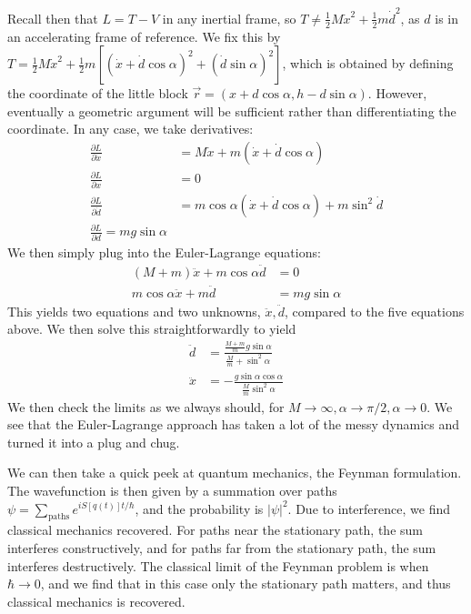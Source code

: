 \documentclass[10pt]{report}
\newcommand{\pd}[2]{\frac{\partial #1}{\partial#2}}
\newcommand{\abs}[1]{\left|#1\right|}
\begin{document}
Recall then that $L=T-V$ in any inertial frame, so $T \neq \frac{1}{2}M\dot{x}^2 + \frac{1}{2}m\dot{d}^2$, as $d$ is in an accelerating frame of reference. We fix this by $T=\frac{1}{2}M\dot{x}^2 + \frac{1}{2}m\left[ \left( \dot{x} + \dot{d}\cos\alpha \right)^2 + \left( \dot{d}\sin \alpha \right)^2 \right]$, which is obtained by defining the coordinate of the little block $\vec{r} = \left( x + d\cos\alpha,h-d\sin\alpha \right)$. However, eventually a geometric argument will be sufficient rather than differentiating the coordinate. In any case, we take derivatives:
\begin{align*}
    \pd{L}{\dot{x}} &= M\dot{x} + m\left( \dot{x} + \dot{d}\cos\alpha \right)\\
    \pd{L}{x} &= 0\\
    \pd{L}{\dot{d}} &= m\cos\alpha\left( \dot{x}+\dot{d}\cos\alpha \right)+m\sin^2 \dot{d}\\
    \pd{L}{d} = mg\sin\alpha
\end{align*}
We then simply plug into the Euler-Lagrange equations:
\begin{align*}
    \left( M+m \right)\ddot{x}+m\cos\alpha\ddot{d} &= 0\\
    m\cos\alpha\ddot{x}+m\ddot{d} &= mg\sin\alpha
\end{align*}
This yields two equations and two unknowns, $\ddot{x},\ddot{d}$, compared to the five equations above. We then solve this straightforwardly to yield
\begin{align*}
    \ddot{d} &= \frac{\frac{M+m}{m}g\sin\alpha}{\frac{M}{m}+\sin^2\alpha}\\
    \ddot{x} &= -\frac{g\sin\alpha\cos\alpha}{\frac{M}{m}\sin^2\alpha}
\end{align*}
We then check the limits as we always should, for $M \to \infty, \alpha \to \pi/2, \alpha \to 0$. We see that the Euler-Lagrange approach has taken a lot of the messy dynamics and turned it into a plug and chug. 

We can then take a quick peek at quantum mechanics, the Feynman formulation. The wavefunction is then given by a summation over paths $\psi = \sum_{\text{paths}}e^{iS[q(t)]t/\hbar}$, and the probability is $\abs{\psi}^2$. Due to interference, we find classical mechanics recovered. For paths near the stationary path, the sum interferes constructively, and for paths far from the stationary path, the sum interferes destructively. The classical limit of the Feynman problem is when $\hbar \to 0$, and we find that in this case only the stationary path matters, and thus classical mechanics is recovered. 
\end{document}

